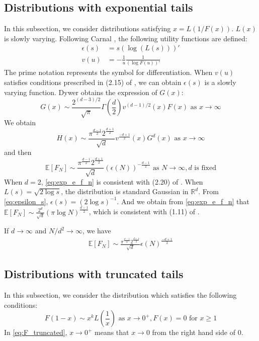 \documentclass{aptpub}
\def\E{\mathbb{E}}
\def\R{\mathbb{R}}
\begin{document}
\subsection{Distributions with exponential tails}
In this subsection, we consider distributions satisfying
$x = L(1/F(x)) $. $L(x)$ is slowly varying. Following Carnal \cite{carnal1970konvexe},
the following utility functions are defined:
\begin{align}
     \epsilon(s) & = s (\log (L(s)))' \label{eq:epsilon_s}\\
     v(u) &= -\frac{1}{u} \frac{1}{(\log F(u))'}    
\end{align}
The prime notation represents the symbol for differentiation. When $v(u)$ satisfies
conditions prescribed in (2.15) of \cite{carnal1970konvexe},
we can obtain $\epsilon(s)$ is a slowly varying function.
Dywer \cite{dwyer1991convex} obtains the expression of $G(x)$:
\begin{equation}\label{eq:G_x_exp}
     G(x) \sim \frac{2^{(d-3)/2}}{\sqrt{\pi}}\Gamma(\frac{d}{2}) v^{(d-1)/2}(x) F(x)
      \textrm{ as } x\to \infty
\end{equation}
We obtain 
\begin{equation}\label{eq:H_x_exp}
     H(x) \sim \frac{\pi^{\frac{d-1}{2}} 2^{\frac{d+1}{2}}}{\sqrt{d}}v^{\frac{-d+1}{2}}(x)G^d(x)
     \textrm{ as } x\to \infty
\end{equation}
 and then
 \begin{equation}\label{eq:exp_e_f_n}
     \E[F_N]\sim \frac{\pi^{\frac{d-1}{2}} 2^{\frac{d+1}{2}}}{\sqrt{d}} (\epsilon(N))^{-\frac{d-1}{2}}
     \textrm{ as } N \to \infty, d \textrm { is fixed}
 \end{equation}
 When $d=2$, \eqref{eq:exp_e_f_n} is consistent with (2.20) of \cite{carnal1970konvexe}.
 When $L(s)=\sqrt{2\log s}$, the distribution is standard Gaussian in $\R^d$.
 From \eqref{eq:epsilon_s}, $\epsilon(s) = (2\log s)^{-1}$. And we obtain from \eqref{eq:exp_e_f_n}
 that $\E[F_N]\sim \frac{2^d}{\sqrt{d}}(\pi \log N)^{\frac{d-1}{2}}$,
 which is consistent with (1.11) of \cite{raynaud1970enveloppe}.

 If $d\to\infty$ and $N/d^2\to \infty$, we have
\begin{align}\label{eq:d_infty_exp_E_F_N}
      \E[F_N]\sim \frac{\pi^{\frac{d-1}{2}} 2^{\frac{d+1}{2}}}{\sqrt{d}} \epsilon(N)^{\frac{-d+1}{2}}
\end{align}
\subsection{Distributions with truncated tails}
In this subsection, we consider the distribution which satisfies
the following conditions:
\begin{equation}\label{eq:F_truncated}
     F(1-x) \sim x^k L\left(\frac{1}{x} \right)  \text{ as } x \to 0^+,
     F(x) = 0 \text{ for } x \geq 1
\end{equation}
In \eqref{eq:F_truncated}, $x \to 0^+$ means that $x\to 0$ from the right hand side of $0$.
\end{document}
